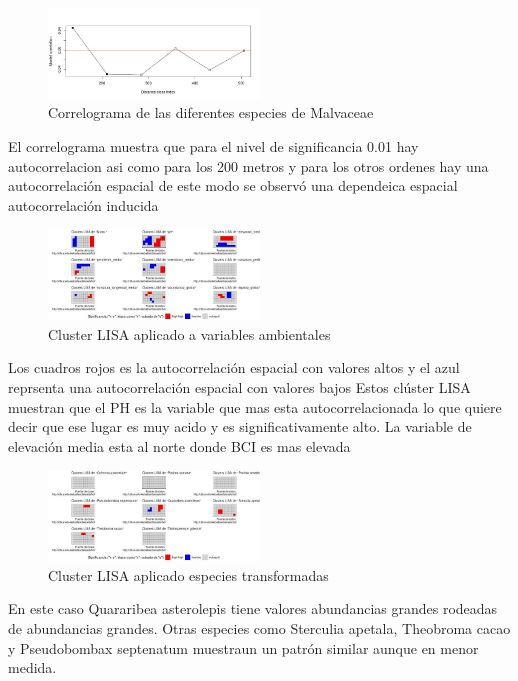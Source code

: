 \documentclass[11pt,]{article}
\begin{document}
\begin{figure}
\centering
\includegraphics[width=0.50000\textwidth]{mi_fam_correlograma.jpg}
\caption{Correlograma de las diferentes especies de Malvaceae}
\end{figure}

El correlograma muestra que para el nivel de significancia 0.01 hay
autocorrelacion asi como para los 200 metros y para los otros ordenes
hay una autocorrelación espacial de este modo se observó una dependeica
espacial autocorrelación inducida

\begin{figure}
\centering
\includegraphics[width=0.50000\textwidth]{cluster_LISA.jpg}
\caption{Cluster LISA aplicado a variables ambientales}
\end{figure}

Los cuadros rojos es la autocorrelación espacial con valores altos y el
azul reprsenta una autocorrelación espacial con valores bajos Estos
clúster LISA muestran que el PH es la variable que mas esta
autocorrelacionada lo que quiere decir que ese lugar es muy acido y es
significativamente alto. La variable de elevación media esta al norte
donde BCI es mas elevada

\begin{figure}
\centering
\includegraphics[width=0.50000\textwidth]{cluster_LISA_aplicado_especies_transformadas.jpg}
\caption{Cluster LISA aplicado especies transformadas}
\end{figure}

En este caso Quararibea asterolepis tiene valores abundancias grandes
rodeadas de abundancias grandes. Otras especies como Sterculia apetala,
Theobroma cacao y Pseudobombax septenatum muestraun un patrón similar
aunque en menor medida.
\end{document}
